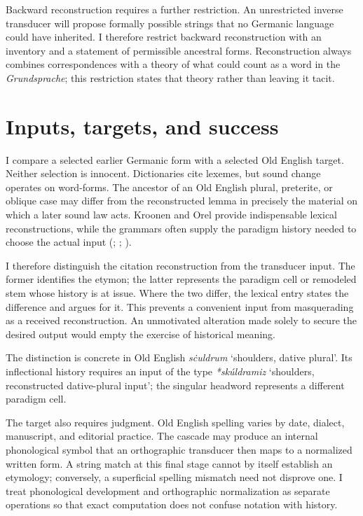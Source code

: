 \documentclass[
  british,
  a4paper,
  openany]{book}
\providecommand{\Recon}[1]{\emph{*#1}}
{\catcode`→=\active \global\def→{\ensuremath{\rightarrow}}}
\providecommand{\Recon}[1]{\emph{*#1}}
{\catcode`→=\active \global\def→{\ensuremath{\rightarrow}}}
\begin{document}
Backward reconstruction requires a further restriction. An unrestricted
inverse transducer will propose formally possible strings that no
Germanic language could have inherited. I therefore restrict backward
reconstruction with an inventory and a statement of permissible
ancestral forms. Reconstruction always combines correspondences with a
theory of what could count as a word in the \emph{Grundsprache}; this
restriction states that theory rather than leaving it tacit.

\section{Inputs, targets, and success}\label{inputs-targets-and-success}

I compare a selected earlier Germanic form with a selected Old English
target. Neither selection is innocent. Dictionaries cite lexemes, but
sound change operates on word-forms. The ancestor of an Old English
plural, preterite, or oblique case may differ from the reconstructed
lemma in precisely the material on which a later sound law acts. Kroonen
and Orel provide indispensable lexical reconstructions, while the
grammars often supply the paradigm history needed to choose the actual
input (;
;
).

I therefore distinguish the citation reconstruction from the transducer
input. The former identifies the etymon; the latter represents the
paradigm cell or remodeled stem whose history is at issue. Where the two
differ, the lexical entry states the difference and argues for it. This
prevents a convenient input from masquerading as a received
reconstruction. An unmotivated alteration made solely to secure the
desired output would empty the exercise of historical meaning.

The distinction is concrete in Old English
{\emph{sċuldrum}}
`shoulders, dative plural'. Its inflectional history requires an input
of the type
\Recon{skúldramiz}
`shoulders, reconstructed dative-plural input'; the singular headword
represents a different paradigm cell.

The target also requires judgment. Old English spelling varies by date,
dialect, manuscript, and editorial practice. The cascade may produce an
internal phonological symbol that an orthographic transducer then maps
to a normalized written form. A string match at this final stage cannot
by itself establish an etymology; conversely, a superficial spelling
mismatch need not disprove one. I treat phonological development and
orthographic normalization as separate operations so that exact
computation does not confuse notation with history.
\end{document}
